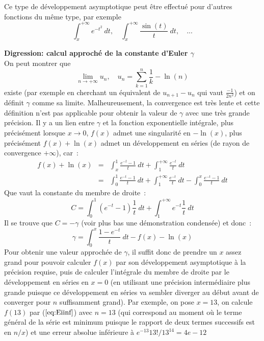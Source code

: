 \documentclass[a4paper,11pt]{article}
\begin{document}
\begin{giacjshere}
Ce type de d\'eveloppement asymptotique peut \^etre effectu\'e pour
d'autres fonctions du m\^eme type, par exemple
\[ \int_x^{+\infty} e^{-t^2} \ dt, \quad \int_x^{+\infty} \frac{\sin(t)}{t} \ dt, \quad ... \]


{\bf Digression: calcul approché de la constante d'Euler
  $\gamma$}\\
On peut montrer que
\begin{equation} \label{eq:def_gamma}
 \lim_{n\rightarrow +\infty} u_n, \quad u_n=\sum_{k=1}^{n}\frac{1}{k} - \ln(n) 
\end{equation}
existe (par exemple en cherchant un \'equivalent de $u_{n+1}-u_n$ qui vaut 
$\frac{-1}{2n^2}$)
et on définit $\gamma$ comme sa limite. Malheureusement, la convergence
est très lente et cette définition n'est pas applicable pour obtenir la valeur
de $\gamma$ avec une très grande précision.
Il y a un lien entre $\gamma$ et la fonction exponentielle intégrale, plus précisément
lorsque $x\rightarrow 0$, $f(x)$ admet une singularité en $-\ln(x)$,
plus précisément $f(x)+\ln(x)$
admet un développement en séries (de rayon de convergence $+\infty$), car~:
\begin{eqnarray*}
 f(x)+\ln(x)&=&\int_x^{1}\frac{e^{-t}-1}{t} \ dt + \int_1^{+\infty} \frac{e^{-t}}{t} \ dt \\
&=& \int_0^{1}\frac{e^{-t}-1}{t} \ dt + \int_1^{+\infty} \frac{e^{-t}}{t} \ dt
- \int_0^{x} \frac{e^{-t}-1}{t} \ dt
\end{eqnarray*}
Que vaut la constante du membre de droite~:
\[ C=\int_0^{1}(e^{-t}-1)\frac{1}{t} \ dt + \int_1^{+\infty} e^{-t} \frac{1}{t} \ dt \]
Il se trouve que $C=-\gamma$ (voir plus bas une démonstration condensée) et donc~:
\begin{equation} \label{eq:gamma}
 \gamma= \int_0^{x} \frac{1-e^{-t}}{t} \ dt -f(x)-\ln(x)
\end{equation}
Pour obtenir une valeur approchée de $\gamma$, il suffit donc de prendre un $x$ assez grand
pour pouvoir calculer $f(x)$ par son développement asymptotique à la précision requise,
puis de calculer l'intégrale du membre de droite par le développement en séries en $x=0$
(en utilisant une précision intermédiaire plus grande puisque ce développement en séries
va sembler diverger au début avant de converger pour $n$ suffisamment grand).
Par exemple, on pose $x=13$, on calcule $f(13)$ par (\(\ref{eq:Eiinf}\))
avec $n=13$ (qui correspond au moment o\`u le terme g\'en\'eral
de la s\'erie est minimum puisque le rapport de deux termes successifs
est en $n/x$)
et une erreur absolue inf\'erieure \`a $e^{-13} 13!/13^{14}=4e-12$

\end{giacjshere}
\end{document}
